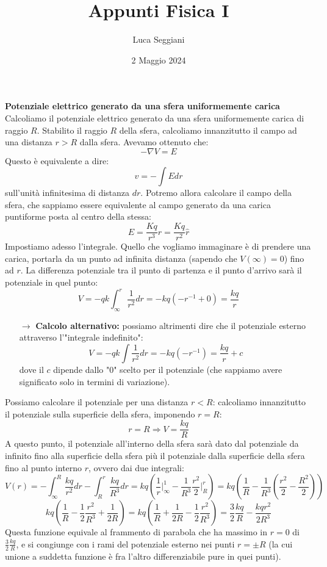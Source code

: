 \documentclass[a4paper,12pt]{article}
\title{Appunti Fisica I}
\author{Luca Seggiani}
\date{2 Maggio 2024}
\begin{document}
\maketitle
\par\smallskip
\textbf{Potenziale elettrico generato da una sfera uniformemente carica} \\
Calcoliamo il potenziale elettrico generato da una sfera uniformemente carica di raggio $R$. Stabilito il raggio $R$ della sfera, calcoliamo innanzitutto il campo ad una distanza $r > R$ dalla sfera. 
Avevamo ottenuto che:
$$ -\nabla V = E $$
Questo è equivalente a dire:
$$ v = -\int E dr $$
sull'unità infinitesima di distanza $dr$. Potremo allora calcolare il campo della sfera, che sappiamo essere equivalente al campo generato da una carica puntiforme posta al centro della stessa:
$$ E = \frac{Kq}{r^3}r = \frac{Kq}{r^2}\hat{r} $$
Impostiamo adesso l'integrale. Quello che vogliamo immaginare è di prendere una carica, portarla da un punto ad infinita distanza (sapendo che $V(\infty) = 0$) fino ad $r$. La differenza potenziale
tra il punto di partenza e il punto d'arrivo sarà il potenziale in quel punto:
$$ V = -qk\int_\infty^r \frac{1}{r^2} dr = -kq(-r^{-1} + 0) = \frac{kq}{r} $$
\begin{itemize}
  \item[$\rightarrow$] \textbf{Calcolo alternativo:} possiamo altrimenti dire che il potenziale esterno attraverso l'"integrale indefinito":
$$ V = -qk\int \frac{1}{r^2} dr = -kq(-r^{-1}) = \frac{kq}{r} + c $$
dove il $c$ dipende dallo "0" scelto per il potenziale (che sappiamo avere significato solo in termini di variazione).
\end{itemize}
Possiamo calcolare il potenziale per una distanza $r < R$: calcoliamo innanzitutto il potenziale sulla superficie della sfera, imponendo $r=R$:
$$ r = R \Rightarrow V = \frac{kq}{R} $$
A questo punto, il potenziale all'interno della sfera sarà dato dal potenziale da infinito fino alla superficie della sfera più il potenziale dalla superficie della sfera fino al punto interno $r$, ovvero dai due integrali:
$$ V(r) =-\int_\infty^R \frac{kq}{r^2}dr - \int_R^r \frac{kq}{R^3}dr = kq\left(\frac{1}{r}\Big|^1_\infty - \frac{1}{R^3} \frac{r^2}{2}\Big|^r_R\right) = kq\left(\frac{1}{R} - \frac{1}{R^3}\left(\frac{r^2}{2} - \frac{R^2}{2}\right)\right) $$
$$ kq\left(\frac{1}{R} - \frac{1}{2}\frac{r^2}{R^3} + \frac{1}{2R}\right) = kq\left(\frac{1}{R} + \frac{1}{2R} - \frac{1}{2} \frac{r^2}{R^3}\right) = \frac{3}{2} \frac{kq}{R} - \frac{kqr^2}{2R^3} $$
Questa funzione equivale al frammento di parabola che ha massimo in $r = 0$ di $\frac{3}{2} \frac{kq}{R}$, e si congiunge con i rami del potenziale esterno nei punti $r = \pm R$ (la cui unione a suddetta funzione è fra l'altro differenziabile pure in quei punti).
\end{document}
